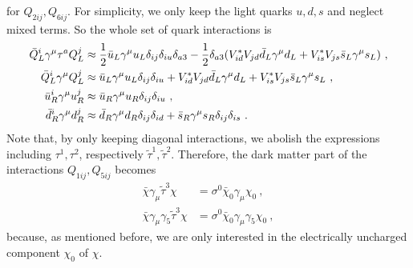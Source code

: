 for $Q_{2ij}, Q_{6ij}$. For simplicity, we only keep the light quarks $u,d,s$ and neglect mixed terms. So the whole set of quark interactions is
\begin{align}
	\bar{Q}_L^i\gamma^\mu\tau^a Q_L^j &\approx \frac{1}{2}\bar{u}_L\gamma^\mu u_L\delta_{ij}\delta_{iu}\delta_{a3} - \frac{1}{2}\delta_{a3}(V_{id}^*V_{jd}\bar{d}_L\gamma^\mu d_L + V_{is}^*V_{js}\bar{s}_L\gamma^\mu s_L) \ , \notag \\
	\bar{Q}_L^i\gamma^\mu Q_L^j &\approx \bar{u}_L\gamma^\mu u_L\delta_{ij}\delta_{iu} + V_{id}^*V_{jd}\bar{d}_L\gamma^\mu d_L + V_{is}^*V_{js}\bar{s}_L\gamma^\mu s_L \ , \notag \\
	\bar{u}_R^i\gamma^\mu u_R^j &\approx\bar{u}_R\gamma^\mu u_R\delta_{ij}\delta_{iu} \ , \notag \\
	\bar{d}_R^i\gamma^\mu d_R^j &\approx \bar{d}_R\gamma^\mu d_R\delta_{ij}\delta_{id} + \bar{s}_R\gamma^\mu s_R\delta_{ij}\delta_{is} \ .
\end{align}
Note that, by only keeping diagonal interactions, we abolish the expressions including $\tau^1,\tau^2$, respectively $\tilde{\tau}^1,\tilde{\tau}^2$. Therefore, the dark matter part of the interactions $Q_{1ij},Q_{5ij}$ becomes
\begin{align}
	\bar{\chi}\gamma_\mu\tilde{\tau}^3\chi &= \sigma^0\bar{\chi}_0\gamma_\mu\chi_0 \ , \\
	\bar{\chi}\gamma_\mu\gamma_5\tilde{\tau}^3\chi &= \sigma^0\bar{\chi}_0\gamma_\mu\gamma_5\chi_0 \ ,
\end{align}
because, as mentioned before, we are only interested in the electrically uncharged component $\chi_0$ of $\chi$.


